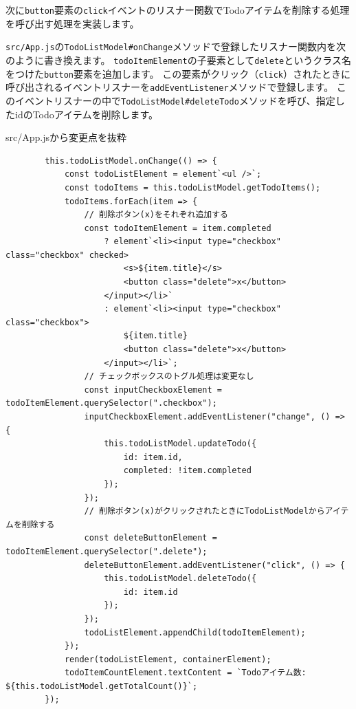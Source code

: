 次に\texttt{button}要素の\texttt{click}イベントのリスナー関数でTodoアイテムを削除する処理を呼び出す処理を実装します。

\texttt{src/App.js}の\texttt{TodoListModel\#onChange}メソッドで登録したリスナー関数内を次のように書き換えます。
\texttt{todoItemElement}の子要素として\texttt{delete}というクラス名をつけた\texttt{button}要素を追加します。
この要素がクリック（\texttt{click}）されたときに呼び出されるイベントリスナーを\texttt{addEventListener}メソッドで登録します。
このイベントリスナーの中で\texttt{TodoListModel\#deleteTodo}メソッドを呼び、指定したidのTodoアイテムを削除します。

\begin{listtitle}
src/App.jsから変更点を抜粋
\end{listtitle}
\begin{lstlisting}
        this.todoListModel.onChange(() => {
            const todoListElement = element`<ul />`;
            const todoItems = this.todoListModel.getTodoItems();
            todoItems.forEach(item => {
                // 削除ボタン(x)をそれぞれ追加する
                const todoItemElement = item.completed
                    ? element`<li><input type="checkbox" class="checkbox" checked>
                        <s>${item.title}</s>
                        <button class="delete">x</button>
                    </input></li>`
                    : element`<li><input type="checkbox" class="checkbox">
                        ${item.title}
                        <button class="delete">x</button>
                    </input></li>`;
                // チェックボックスのトグル処理は変更なし
                const inputCheckboxElement = todoItemElement.querySelector(".checkbox");
                inputCheckboxElement.addEventListener("change", () => {
                    this.todoListModel.updateTodo({
                        id: item.id,
                        completed: !item.completed
                    });
                });
                // 削除ボタン(x)がクリックされたときにTodoListModelからアイテムを削除する
                const deleteButtonElement = todoItemElement.querySelector(".delete");
                deleteButtonElement.addEventListener("click", () => {
                    this.todoListModel.deleteTodo({
                        id: item.id
                    });
                });
                todoListElement.appendChild(todoItemElement);
            });
            render(todoListElement, containerElement);
            todoItemCountElement.textContent = `Todoアイテム数: ${this.todoListModel.getTotalCount()}`;
        });
\end{lstlisting}
\listend

